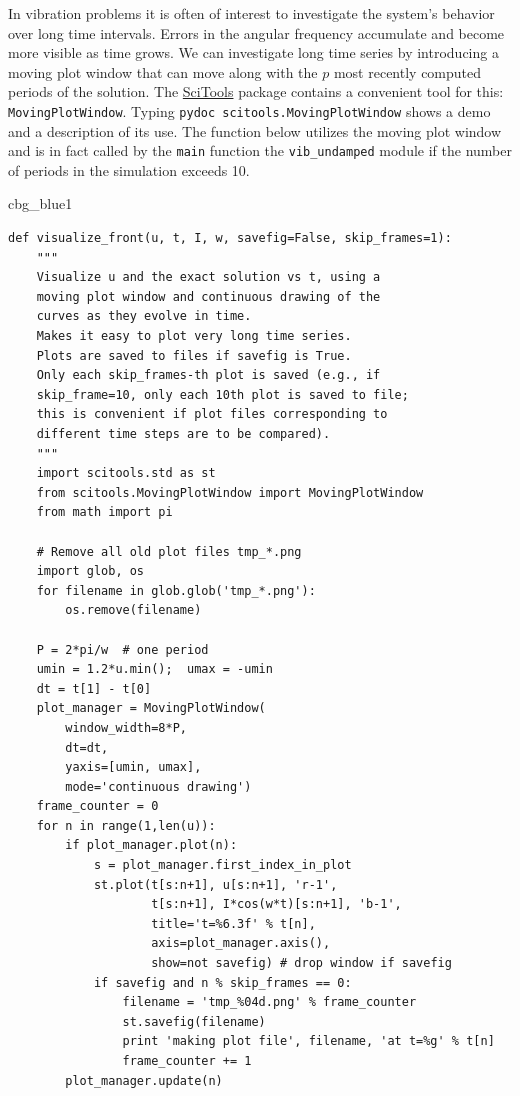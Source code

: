 \documentclass[%
oneside,                 %
final,                   %
10pt]{article}
\newenvironment{_cod_tight}[1]{
   \def\FrameCommand{\colorbox{#1}}
   \FrameRule0.6pt\MakeFramed {\FrameRestore}\vskip3mm}
   {\vskip0mm\endMakeFramed}
\newenvironment{cod}[1]{
\bgroup\rmfamily
\fboxsep=0mm\relax
\begin{_cod_tight}{#1}
\list{}{\parsep=-2mm\parskip=0mm\topsep=0pt\leftmargin=2mm
\rightmargin=2\leftmargin\leftmargin=4pt\relax}
\item\relax}
{\endlist\end{_cod_tight}\egroup}
\begin{document}
In vibration problems it is often of interest to investigate the system's
behavior over long time intervals. Errors in the angular frequency accumulate
and become more visible as time grows. We can investigate long
time series by introducing a moving plot window that can move along with
the $p$ most recently computed periods of the solution. The
\href{{https://github.com/hplgit/scitools}}{SciTools} package contains
a convenient tool for this: \texttt{MovingPlotWindow}. Typing
\texttt{pydoc scitools.MovingPlotWindow} shows a demo and a description of its use.
The function below utilizes the moving plot window and is in fact
called by the \texttt{main} function the \Verb!vib_undamped! module
if the number of periods in the simulation exceeds 10.

\begin{cod}{cbg_blue1}\begin{Verbatim}[numbers=none,fontsize=\fontsize{9pt}{9pt},baselinestretch=0.95,xleftmargin=2mm]
def visualize_front(u, t, I, w, savefig=False, skip_frames=1):
    """
    Visualize u and the exact solution vs t, using a
    moving plot window and continuous drawing of the
    curves as they evolve in time.
    Makes it easy to plot very long time series.
    Plots are saved to files if savefig is True.
    Only each skip_frames-th plot is saved (e.g., if
    skip_frame=10, only each 10th plot is saved to file;
    this is convenient if plot files corresponding to
    different time steps are to be compared).
    """
    import scitools.std as st
    from scitools.MovingPlotWindow import MovingPlotWindow
    from math import pi

    # Remove all old plot files tmp_*.png
    import glob, os
    for filename in glob.glob('tmp_*.png'):
        os.remove(filename)

    P = 2*pi/w  # one period
    umin = 1.2*u.min();  umax = -umin
    dt = t[1] - t[0]
    plot_manager = MovingPlotWindow(
        window_width=8*P,
        dt=dt,
        yaxis=[umin, umax],
        mode='continuous drawing')
    frame_counter = 0
    for n in range(1,len(u)):
        if plot_manager.plot(n):
            s = plot_manager.first_index_in_plot
            st.plot(t[s:n+1], u[s:n+1], 'r-1',
                    t[s:n+1], I*cos(w*t)[s:n+1], 'b-1',
                    title='t=%6.3f' % t[n],
                    axis=plot_manager.axis(),
                    show=not savefig) # drop window if savefig
            if savefig and n % skip_frames == 0:
                filename = 'tmp_%04d.png' % frame_counter
                st.savefig(filename)
                print 'making plot file', filename, 'at t=%g' % t[n]
                frame_counter += 1
        plot_manager.update(n)
\end{Verbatim}
\end{cod}
\noindent
\end{document}
